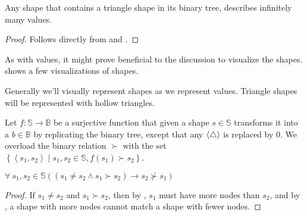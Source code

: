 \begin{lemma} Any shape that contains a triangle shape in its binary tree,
describes infinitely many values.\end{lemma}

\begin{proof} Follows directly from  and
.\end{proof} 

As with values, it might prove beneficial to the discussion to visualize the
shapes.  shows a few visualizations
of shapes. 

\begin{definition} Generally we'll visually represent shapes as we represent
values. Triangle shapes will be represented with hollow triangles.
\end{definition}


\begin{definition}\label{definition:shape-matches-shape} Let $f : \mathbb{S}
\rightarrow \mathbb{B}$ be a surjective function that given a shape
$s\in\mathbb{S}$ transforms it into a $b\in\mathbb{B}$ by replicating the
binary tree, except that any $\left\langle\bigtriangleup\right\rangle$ is replaced by $0$. We overload the binary
relation $\succ$ with the set $\left\{ \left\langle s_1, s_2 \right\rangle \mid
s_1,s_2 \in\mathbb{S}, f(s_1)\succ s_2 \right\}$.\end{definition}

\begin{lemma} $\forall\ s_1, s_2 \in \mathbb{S} \left(\left(s_1\neq s_2 \wedge
s_1\succ s_2\right) \rightarrow s_2\nsucc s_1\right)$\end{lemma}

\begin{proof}If $s_1\neq s_2$ and $s_1\succ s_2$, then by
, $s_1$ must have more nodes than $s_2$, and by
, a shape with more nodes cannot match a shape with
fewer nodes.\end{proof}
